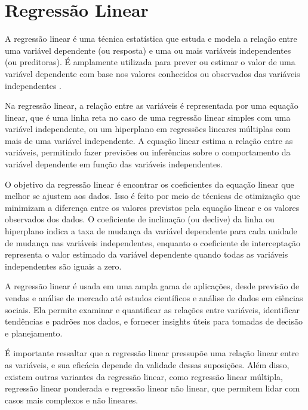 \chapter{Regressão Linear}

A regressão linear é uma técnica estatística que estuda e modela a relação entre uma variável dependente (ou resposta) e uma ou mais variáveis independentes (ou preditoras). É amplamente utilizada para prever ou estimar o valor de uma variável dependente com base nos valores conhecidos ou observados das variáveis independentes \parencite{Bussab2017}.

Na regressão linear, a relação entre as variáveis é representada por uma equação linear, que é uma linha reta no caso de uma regressão linear simples com uma variável independente, ou um hiperplano em regressões lineares múltiplas com mais de uma variável independente. A equação linear estima a relação entre as variáveis, permitindo fazer previsões ou inferências sobre o comportamento da variável dependente em função das variáveis independentes.

O objetivo da regressão linear é encontrar os coeficientes da equação linear que melhor se ajustem aos dados. Isso é feito por meio de técnicas de otimização que minimizam a diferença entre os valores previstos pela equação linear e os valores observados dos dados. O coeficiente de inclinação (ou declive) da linha ou hiperplano indica a taxa de mudança da variável dependente para cada unidade de mudança nas variáveis independentes, enquanto o coeficiente de interceptação representa o valor estimado da variável dependente quando todas as variáveis independentes são iguais a zero.

A regressão linear é usada em uma ampla gama de aplicações, desde previsão de vendas e análise de mercado até estudos científicos e análise de dados em ciências sociais. Ela permite examinar e quantificar as relações entre variáveis, identificar tendências e padrões nos dados, e fornecer insights úteis para tomadas de decisão e planejamento.

É importante ressaltar que a regressão linear pressupõe uma relação linear entre as variáveis, e sua eficácia depende da validade dessas suposições. Além disso, existem outras variantes da regressão linear, como regressão linear múltipla, regressão linear ponderada e regressão linear não linear, que permitem lidar com casos mais complexos e não lineares.